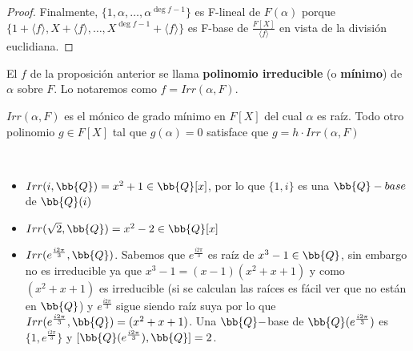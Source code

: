 \begin{prop}
\begin{proof}
        Finalmente, $\{1, \alpha, \dots, \alpha^{\deg f -1}\}$ es F-lineal de $F(\alpha)$ porque $\{1+\langle f \rangle, X + \langle f \rangle, \dots, X^{\deg f -1} + \langle f \rangle\}$ es F-base de $\frac{F[X]}{\langle f \rangle}$ en vista de la división euclidiana.
    \end{proof}
\end{prop}

\begin{definicion}
    El $f$ de la proposición anterior se llama \textbf{polinomio irreducible} (o \textbf{mínimo}) de $\alpha$ sobre $F$. Lo notaremos como $f=Irr(\alpha, F)$.
\end{definicion}

\begin{observacion}
    $Irr(\alpha, F)$ es el mónico de grado mínimo en $F[X]$ del cual $\alpha$ es raíz. Todo otro polinomio $g\in F[X]$ tal que $g(\alpha)=0$ satisface que $g = h \cdot  Irr(\alpha, F)$
\end{observacion}

\begin{ejemplo}\
    \begin{itemize}
        \item $Irr(i,\bb{Q}) = x^2 +1\in \bb{Q}[x]$, por lo que $\{1,i\}$ es una $\bb{Q}-base$ de $\bb{Q}(i)$
        \item $Irr(\sqrt{2}, \bb{Q}) = x^2 -2\in \bb{Q}[x]$
        \item $Irr(e^{\frac{i2\pi}{3}}, \bb{Q})$. Sabemos que $e^{\frac{i2\pi}{3}}$ es raíz de $x^3-1\in \bb{Q}$, sin embargo no es irreducible ya que $x^3 -1 = (x-1)(x^2+x+1)$ y como $(x^2+x+1)$ es irreducible (si se calculan las raíces es fácil ver que no están en $\bb{Q}$) y $e^{\frac{i2\pi}{3}}$ sigue siendo raíz suya por lo que $Irr(e^{\frac{i2\pi}{3}}, \bb{Q}) = (x^2+x+1)$. Una $\bb{Q}-$base de $\bb{Q}(e^{\frac{i2\pi}{3}})$ es $\{1, e^{\frac{i2\pi}{3}}\}$ y $[\bb{Q}(e^{\frac{i2\pi}{3}}), \bb{Q}]=2$.
    \end{itemize}
\end{ejemplo}
